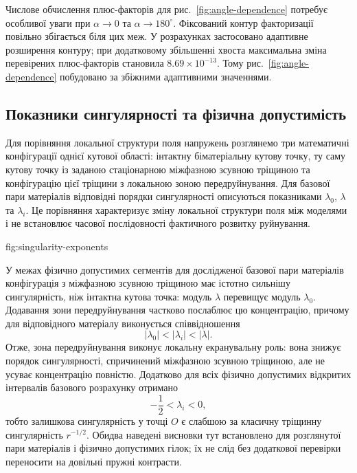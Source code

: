 Числове обчислення плюс-факторів для рис.~\ref{fig:angle-dependence}
потребує особливої уваги при $\alpha\to0$ та
$\alpha\to180^\circ$. Фіксований контур факторизації повільно збігається
біля цих меж. У розрахунках застосовано адаптивне розширення контуру; при
додатковому збільшенні хвоста максимальна зміна перевірених
плюс-факторів становила $8.69\times10^{-13}$. Тому
рис.~\ref{fig:angle-dependence} побудовано за збіжними адаптивними
значеннями.

\subsection{Показники сингулярності та фізична допустимість}
\label{subsec:figure4}

Для порівняння локальної структури поля напружень розглянемо три
математичні конфігурації однієї кутової області: інтактну біматеріальну
кутову точку, ту саму кутову точку із заданою стаціонарною міжфазною
зсувною тріщиною та конфігурацію цієї тріщини з локальною зоною
передруйнування. Для базової пари матеріалів відповідні порядки
сингулярності описуються показниками $\lambda_0$, $\lambda$ та
$\lambda_i$. Це порівняння характеризує зміну локальної структури поля
між моделями і не встановлює часової послідовності фактичного розвитку
руйнування.

%
{fig:singularity-exponents}

У межах фізично допустимих сегментів для дослідженої базової пари
матеріалів конфігурація з міжфазною зсувною тріщиною має істотно
сильнішу сингулярність, ніж інтактна кутова точка: модуль $\lambda$
перевищує модуль $\lambda_0$. Додавання зони передруйнування частково
послаблює цю концентрацію, причому для відповідного матеріалу виконується
співвідношення
\begin{equation*}
  |\lambda_0|<|\lambda_i|<|\lambda|.
\end{equation*}
Отже, зона передруйнування виконує локальну екранувальну роль: вона
знижує порядок сингулярності, спричинений міжфазною зсувною тріщиною,
але не усуває концентрацію повністю. Додатково для всіх фізично
допустимих відкритих інтервалів базового розрахунку отримано
\begin{equation*}
  -\frac12<\lambda_i<0,
\end{equation*}
тобто залишкова сингулярність у точці $O$ є слабшою за класичну
тріщинну сингулярність $r^{-1/2}$. Обидва наведені висновки тут
встановлено для розглянутої пари матеріалів і фізично допустимих гілок;
їх не слід без додаткової перевірки переносити на довільні пружні
контрасти.

